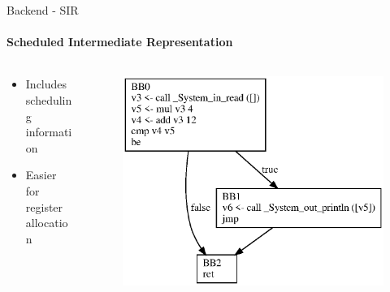 \documentclass[en,16:9]{sdqbeamer}
\begin{document}
\begin{frame}{Backend - SIR}
	\framesubtitle{Scheduled Intermediate Representation}
	
	\begin{columns}
		\begin{column}{0.5\textwidth}
			\begin{itemize}
				\item Includes scheduling information
				\item Easier for register allocation
			\end{itemize}
		\end{column}
	
		\begin{column}{0.5\textwidth}
			\begin{figure}
				\centering
				\includegraphics[scale=0.6]{images/sir-before-reg-alloc}
			\end{figure}
		\end{column}
	\end{columns}
	
\end{frame}
\end{document}
